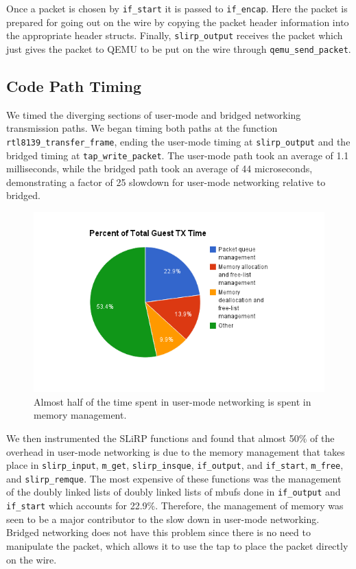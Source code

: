 Once a packet is chosen by \texttt{if\_start} it is passed to \texttt{if\_encap}.
Here the packet is prepared for going out on the wire by copying the packet header information into the appropriate header structs.
Finally, \texttt{slirp\_output} receives the packet which just gives the packet to QEMU to be put on the wire through \texttt{qemu\_send\_packet}. 

\subsection{Code Path Timing}
\label{codePathTiming}
We timed the diverging sections of user-mode and bridged networking transmission paths. 
We began timing both paths at the function \texttt{rtl8139\_transfer\_frame}, ending the user-mode timing at \texttt{slirp\_output} and the bridged timing at \texttt{tap\_write\_packet}. 
The user-mode path took an average of 1.1 milliseconds, while the bridged path took an average of 44 microseconds, demonstrating a factor of 25 slowdown for user-mode networking relative to bridged.

\begin{figure}[htbp]
	\centering
		\includegraphics[scale=0.5]{usermodeTXtime}
	\caption{Almost half of the time spent in user-mode networking is spent in memory management.}
	\label{fig:usermodeTXtime}
\end{figure}

We then instrumented the SLiRP functions and found that almost 50\% of the overhead in user-mode networking is due to the memory management that takes place in \texttt{slirp\_input},
\texttt{m\_get}, \texttt{slirp\_insque}, \texttt{if\_output}, and \texttt{if\_start}, \texttt{m\_free}, and \texttt{slirp\_remque}.
The most expensive of these functions was the management of the doubly linked lists of doubly linked lists of mbufs done in \texttt{if\_output} and \texttt{if\_start} which accounts for 22.9\%.
Therefore, the management of memory was seen to be a major contributor to the slow down in user-mode networking.
Bridged networking does not have this problem since there is no need to manipulate the packet, which allows it to use the tap to place the packet directly on the wire.


